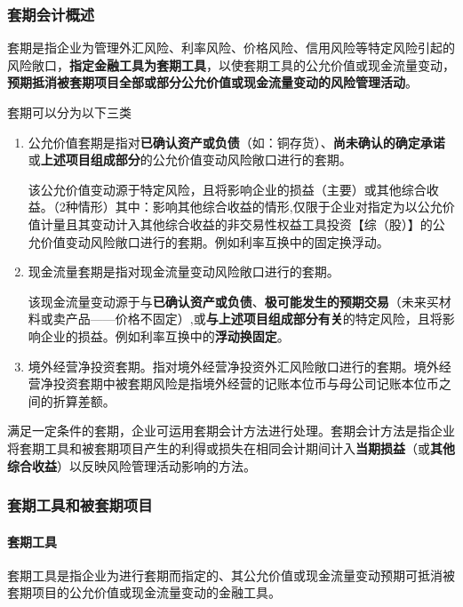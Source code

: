 \documentclass[UTF8,12pt]{ctexart}
\numberwithin{equation}{section} %
\numberwithin{figure}{section}
\numberwithin{table}{section}
\begin{document}
	\subsubsection{套期会计概述}
	套期是指企业为管理外汇风险、利率风险、价格风险、信用风险等特定风险引起的风险敞口，\textbf{指定金融工具为套期工具}，以使套期工具的公允价值或现金流量变动，\textbf{预期抵消被套期项目全部或部分公允价值或现金流量变动的风险管理活动}。
	
	套期可以分为以下三类
	\begin{enumerate}
		\item 公允价值套期是指对\textbf{已确认资产或负债}（如：铜存货）、\textbf{尚未确认的确定承诺}或\textbf{上述项目组成部分}的公允价值变动风险敞口进行的套期。
		
		该公允价值变动源于特定风险，且将影响企业的损益（主要）或其他综合收益。（2种情形）其中：影响其他综合收益的情形,仅限于企业对指定为以公允价值计量且其变动计入其他综合收益的非交易性权益工具投资【综（股）】的公允价值变动风险敞口进行的套期。例如利率互换中的固定换浮动。
		
		\item 现金流量套期是指对现金流量变动风险敞口进行的套期。
		
		该现金流量变动源于与\textbf{已确认资产或负债}、\textbf{极可能发生的预期交易}（未来买材料或卖产品——价格不固定）,或\textbf{与上述项目组成部分有关}的特定风险，且将影响企业的损益。例如利率互换中的\textbf{浮动换固定}。
		
		\item 境外经营净投资套期。指对境外经营净投资外汇风险敞口进行的套期。境外经营净投资套期中被套期风险是指境外经营的记账本位币与母公司记账本位币之间的折算差额。
	\end{enumerate}

	满足一定条件的套期，企业可运用套期会计方法进行处理。套期会计方法是指企业将套期工具和被套期项目产生的利得或损失在相同会计期间计入\textbf{当期损益}（或\textbf{其他综合收益}）以反映风险管理活动影响的方法。
	
	\subsubsection{套期工具和被套期项目}
	\paragraph{套期工具}套期工具是指企业为进行套期而指定的、其公允价值或现金流量变动预期可抵消被套期项目的公允价值或现金流量变动的金融工具。
	
\end{document}

